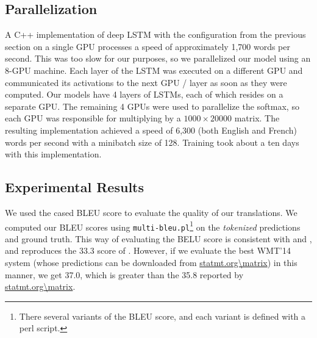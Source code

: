 \subsection{Parallelization}

A C++ implementation of deep LSTM with the configuration from the
previous section on a single GPU processes a speed of approximately
1,700 words per second.  This was too slow for our purposes, so we 
parallelized our model using an 8-GPU machine.  Each layer of the LSTM
was executed on a different GPU and communicated its activations
to the next GPU / layer as soon as they were computed.  Our models
have 4 layers of LSTMs, each of which resides on a separate GPU.  The remaining
4 GPUs were used to parallelize the softmax, so each GPU was
responsible for multiplying by a $1000\times 20000$ matrix.  The
resulting implementation achieved a speed of 6,300 (both English and
French) words per second with a minibatch size of 128. 
Training took about a ten days with this implementation.


\subsection{Experimental Results}

We used the cased BLEU score \cite{bleu} to evaluate the quality of our
translations. We computed our BLEU scores using \texttt{multi-bleu.pl}\footnote{
There several variants of the BLEU score, and each variant is defined  with a perl script. } 
on the \emph{tokenized} predictions and ground truth.
This way of evaluating the BELU score is consistent with \cite{cho14} and \cite{bog14}, and reproduces
the 33.3 score of \cite{wmt14_en_fr}.
However, if we evaluate the best WMT'14 system \cite{durrani-EtAl:2014:W14-33}
(whose predictions can be downloaded from \url{statmt.org\matrix}) in this manner, we get   
37.0, which is greater than the 35.8 reported by \url{statmt.org\matrix}.  




